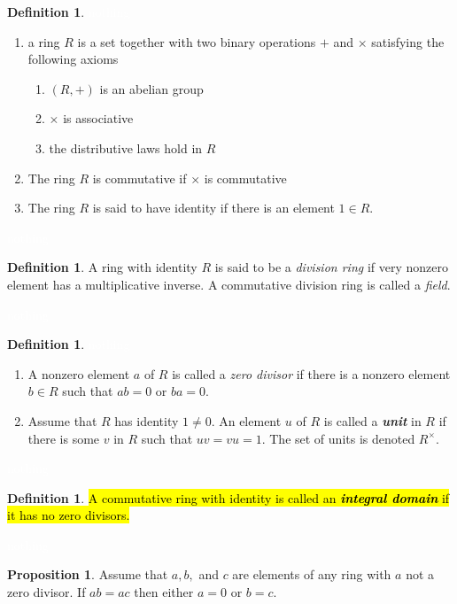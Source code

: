 \documentclass{article}
\theoremstyle{definition}
\newtheorem{prop}[thm]{Proposition}
\newtheorem{defn}[thm]{Definition}
\newcommand{\nl}{\textcolor{white}{nothing}}
\begin{document}
\begin{defn}\nl
\begin{enumerate}
\item a ring $R$ is a set together with two binary operations $+$ and $\times$ satisfying the following axioms
\begin{enumerate}
\item $(R, +)$ is an abelian group 
\item $\times$ is associative 
\item the distributive laws hold in $R$
\end{enumerate}
\item The ring $R$ is commutative if $\times$ is commutative
\item The ring $R$ is said to have identity if there is an element $1\in R$.
\end{enumerate}

\end{defn}

\nl

\begin{defn}
A ring with identity $R$ is said to be a \textit{division ring} if very nonzero element has a multiplicative inverse. A commutative division ring is called a \textit{field}.
\end{defn}

\nl

\begin{defn}\nl
\begin{enumerate}
\item A nonzero element $a$ of $R$ is called a \textit{zero divisor} if there is a nonzero element $b\in R$ such that $ab = 0$ or $ba = 0$.
\item Assume that $R$ has identity $1\neq 0$. An element $u$ of $R$ is called a \textit{\textbf{unit}} in $R$ if there is some $v$ in $R$ such that $uv=vu=1$. The set of units is denoted $R^\times$.
\end{enumerate}
\end{defn}

\nl

\begin{defn}
\hl{A commutative ring with identity is called an \textit{\textbf{integral domain}} if it has no zero divisors.}
\end{defn}

\nl

\begin{prop}
Assume that $a,b,$ and $c$ are elements of any ring with $a$ not a zero divisor. If $ab=ac$ then either $a=0$ or $b=c$.
\end{prop}
\end{document}

